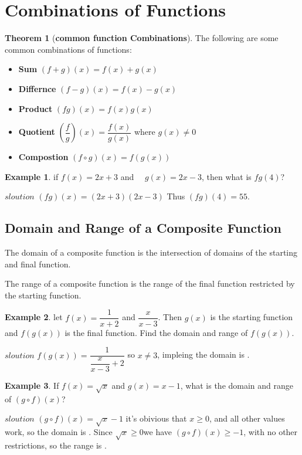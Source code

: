 \documentclass[a4paper]{article}
\theoremstyle{definition}
\newtheorem{exmp}{Example}[section]
\newtheorem{theorem}{Theorem}
\begin{document}
\section{Combinations of Functions}
\begin{theorem}[\textbf{common function Combinations}]
    The following are some common combinations of functions:
    \begin{itemize}
        \item \textbf{Sum} \((f+g)(x) = f(x) + g(x)\)
        \item \textbf{Differnce} \((f-g)(x) = f(x) - g(x)\)
        \item \textbf{Product} \((fg)(x) = f(x)g(x)\)
        \item \textbf{Quotient} \((\dfrac{f}{g} )(x) = \dfrac{f(x)}{g(x)} \)
              where \(g(x) \ne 0\)
        \item \textbf{Compostion} \((f\circ g)(x) = f(g(x))\)
    \end{itemize}

\end{theorem}

\begin{exmp}
    if \(f(x) = 2x + 3\) and \(\quad g(x) = 2x - 3\), then what is \(fg(4)\)?
\end{exmp}
\(sloution\) \( (fg)(x) = (2x+3)(2x-3) \) Thus \((fg)(4) = 55\).
\subsection{Domain and Range of a Composite Function}
The domain of a composite function is the intersection of domains of the starting
and final function.

\noindent
The range of a composite function is the range of the final function restricted by the
starting function.

\begin{exmp}
    let \(f(x) = \dfrac{1}{x+2}\) and \( \dfrac{x}{x-3} \).
    Then \(g(x)\) is the starting function and \( f(g(x)) \) is the final
    function. Find the domain and range of \(f(g(x))\).
\end{exmp}

\noindent
\(sloution\) \(f(g(x)) = \dfrac{1}{\dfrac{x}{x-3} + 2}\) so \(x \ne 3\),
impleing the domain is .

\begin{exmp}
    If \(f(x) = \sqrt{x}\) and \(g(x) = x - 1\), what is the domain and range
    of \((g\circ f)(x)\)?
\end{exmp}
\noindent
\(sloution\) \((g\circ f)(x) = \sqrt{x} - 1\) it's obivious that \(x \ge 0\),
and all other values work, so the domain is 
. Since \( \sqrt{x} \ge 0\)we have \((g\circ f)(x) \ge -1\), with no other restrictions,
so the range is \framebox[\width]{ \([-1,\infty] \) }.
\end{document}

